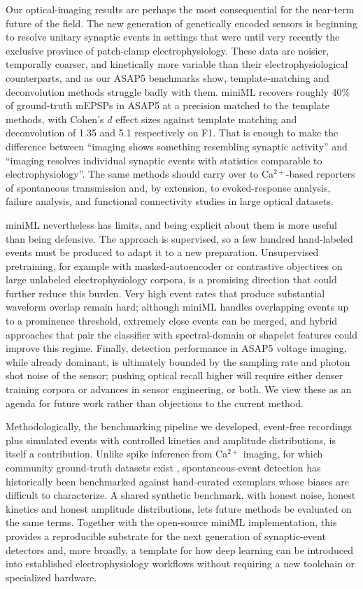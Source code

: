 \documentclass[11pt]{article}
\begin{document}
Our optical-imaging results are perhaps the most consequential for the
near-term future of the field. The new generation of genetically encoded
sensors \citep{aggarwal2023iglusnfr3, hao2024asap5} is beginning to resolve
unitary synaptic events in settings that were until very recently the
exclusive province of patch-clamp electrophysiology. These data are noisier,
temporally coarser, and kinetically more variable than their
electrophysiological counterparts, and as our ASAP5 benchmarks show,
template-matching and deconvolution methods struggle badly with them.
miniML recovers roughly 40\% of ground-truth mEPSPs in ASAP5 at a precision
matched to the template methods, with Cohen's $d$ effect sizes against
template matching and deconvolution of 1.35 and 5.1 respectively on F1.
That is enough to make the difference between ``imaging shows something
resembling synaptic activity'' and ``imaging resolves individual synaptic
events with statistics comparable to electrophysiology''. The same methods
should carry over to Ca$^{2+}$-based reporters of spontaneous transmission
and, by extension, to evoked-response analysis, failure analysis, and
functional connectivity studies in large optical datasets.

miniML nevertheless has limits, and being explicit about them is more useful
than being defensive. The approach is supervised, so a few hundred
hand-labeled events must be produced to adapt it to a new preparation.
Unsupervised pretraining, for example with masked-autoencoder or contrastive
objectives on large unlabeled electrophysiology corpora, is a promising
direction that could further reduce this burden. Very high event rates that
produce substantial waveform overlap remain hard; although miniML handles
overlapping events up to a prominence threshold, extremely close events can
be merged, and hybrid approaches that pair the classifier with
spectral-domain or shapelet features could improve this regime. Finally,
detection performance in ASAP5 voltage imaging, while already dominant, is
ultimately bounded by the sampling rate and photon shot noise of the sensor;
pushing optical recall higher will require either denser training corpora
or advances in sensor engineering, or both. We view these as an agenda for
future work rather than objections to the current method.

Methodologically, the benchmarking pipeline we developed, event-free
recordings plus simulated events with controlled kinetics and amplitude
distributions, is itself a contribution. Unlike spike inference from
Ca$^{2+}$ imaging, for which community ground-truth datasets exist
\citep{rupprecht2021cascade}, spontaneous-event detection has historically
been benchmarked against hand-curated exemplars whose biases are difficult
to characterize. A shared synthetic benchmark, with honest noise, honest
kinetics and honest amplitude distributions, lets future methods be
evaluated on the same terms. Together with the open-source miniML
implementation, this provides a reproducible substrate for the next
generation of synaptic-event detectors and, more broadly, a template for
how deep learning can be introduced into established electrophysiology
workflows without requiring a new toolchain or specialized hardware.
\end{document}
